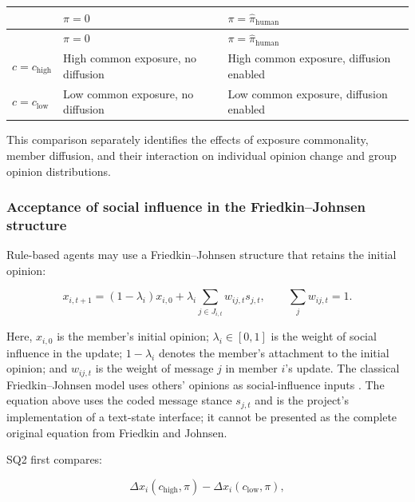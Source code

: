 \documentclass[11pt,a4paper]{article}
\renewcommand{\arraystretch}{1.2}
\begin{document}
\begin{center}
\small
\renewcommand{\arraystretch}{1.18}
\begin{longtable}{@{}p{}p{}p{}@{}}
\toprule
\textbf{} & \textbf{$\pi=0$} & \textbf{$\pi=\hat\pi_{\text{human}}$} \\
\midrule
\endfirsthead
\toprule
\textbf{} & \textbf{$\pi=0$} & \textbf{$\pi=\hat\pi_{\text{human}}$} \\
\midrule
\endhead
$c=c_{\text{high}}$ & High common exposure, no diffusion & High common exposure, diffusion enabled \\
$c=c_{\text{low}}$ & Low common exposure, no diffusion & Low common exposure, diffusion enabled \\
\bottomrule
\end{longtable}
\end{center}

This comparison separately identifies the effects of exposure commonality, member diffusion, and their interaction on individual opinion change and group opinion distributions.

\subsubsection{Acceptance of social influence in the Friedkin--Johnsen structure}

Rule-based agents may use a Friedkin--Johnsen structure that retains the initial opinion:

\begin{equation*}
x_{i,t+1}
=
(1-\lambda_i)x_{i,0}
+
\lambda_i
\sum_{j\in J_{i,t}}
w_{ij,t}s_{j,t},
\qquad
\sum_jw_{ij,t}=1.
\end{equation*}

Here, $x_{i,0}$ is the member's initial opinion; $\lambda_i\in[0,1]$ is the weight of social influence in the update; $1-\lambda_i$ denotes the member's attachment to the initial opinion; and $w_{ij,t}$ is the weight of message $j$ in member $i$'s update. The classical Friedkin--Johnsen model uses others' opinions as social-influence inputs \cite{friedkin1990}. The equation above uses the coded message stance $s_{j,t}$ and is the project's implementation of a text-state interface; it cannot be presented as the complete original equation from Friedkin and Johnsen.

SQ2 first compares:

\begin{equation*}
\Delta x_i(c_{\text{high}},\pi)
-
\Delta x_i(c_{\text{low}},\pi),
\end{equation*}
\end{document}

